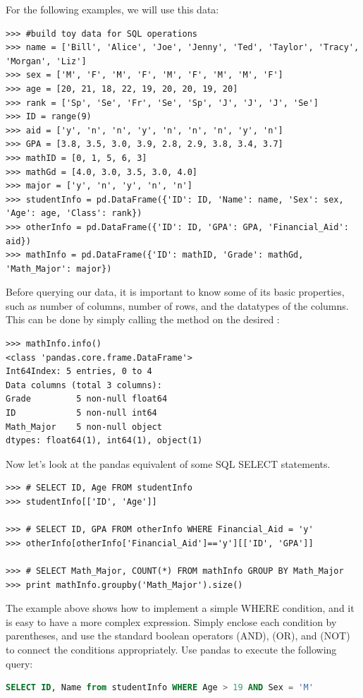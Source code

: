 For the following examples, we will use this data:
\begin{lstlisting}
>>> #build toy data for SQL operations
>>> name = ['Bill', 'Alice', 'Joe', 'Jenny', 'Ted', 'Taylor', 'Tracy', 'Morgan', 'Liz']
>>> sex = ['M', 'F', 'M', 'F', 'M', 'F', 'M', 'M', 'F']
>>> age = [20, 21, 18, 22, 19, 20, 20, 19, 20]
>>> rank = ['Sp', 'Se', 'Fr', 'Se', 'Sp', 'J', 'J', 'J', 'Se']
>>> ID = range(9)
>>> aid = ['y', 'n', 'n', 'y', 'n', 'n', 'n', 'y', 'n']
>>> GPA = [3.8, 3.5, 3.0, 3.9, 2.8, 2.9, 3.8, 3.4, 3.7]
>>> mathID = [0, 1, 5, 6, 3]
>>> mathGd = [4.0, 3.0, 3.5, 3.0, 4.0]
>>> major = ['y', 'n', 'y', 'n', 'n']
>>> studentInfo = pd.DataFrame({'ID': ID, 'Name': name, 'Sex': sex, 'Age': age, 'Class': rank})
>>> otherInfo = pd.DataFrame({'ID': ID, 'GPA': GPA, 'Financial_Aid': aid})
>>> mathInfo = pd.DataFrame({'ID': mathID, 'Grade': mathGd, 'Math_Major': major})
\end{lstlisting}

Before querying our data, it is important to know some of its basic properties, such as
number of columns, number of rows, and the datatypes of the columns. This can be done
by simply calling the  method on the desired :
\begin{lstlisting}
>>> mathInfo.info()
<class 'pandas.core.frame.DataFrame'>
Int64Index: 5 entries, 0 to 4
Data columns (total 3 columns):
Grade         5 non-null float64
ID            5 non-null int64
Math_Major    5 non-null object
dtypes: float64(1), int64(1), object(1)
\end{lstlisting}

Now let's look at the pandas equivalent of some SQL SELECT statements.
\begin{lstlisting}
>>> # SELECT ID, Age FROM studentInfo
>>> studentInfo[['ID', 'Age']]

>>> # SELECT ID, GPA FROM otherInfo WHERE Financial_Aid = 'y'
>>> otherInfo[otherInfo['Financial_Aid']=='y'][['ID', 'GPA']]

>>> # SELECT Math_Major, COUNT(*) FROM mathInfo GROUP BY Math_Major
>>> print mathInfo.groupby('Math_Major').size()
\end{lstlisting}

\begin{problem}
The example above shows how to implement a simple WHERE condition, and it is easy
to have a more complex expression. Simply enclose each condition by parentheses,
and use the standard boolean operators \li{\&} (AND), \li{\|} (OR), and \li{\~} (NOT) to
connect the conditions appropriately. Use pandas to execute the following query:
\begin{lstlisting}[language=SQL]
SELECT ID, Name from studentInfo WHERE Age > 19 AND Sex = 'M'
\end{lstlisting}
\end{problem}


